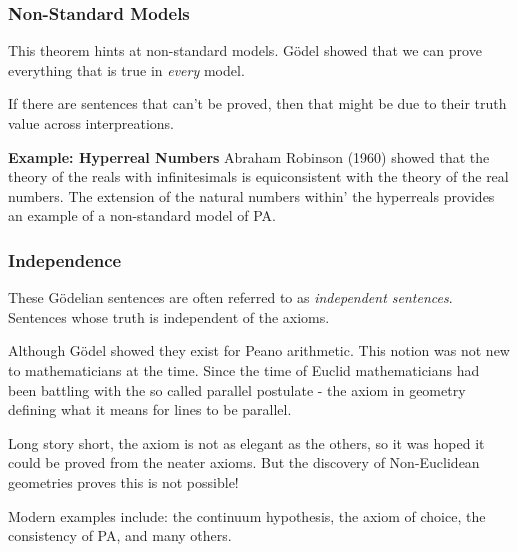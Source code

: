 \documentclass{beamer}
\begin{document}
\begin{frame}
	\frametitle{Non-Standard Models}
	
	This theorem hints at non-standard models. G\"{o}del showed that we can prove everything that is true in \textit{every} model. 
	
	\vspace{0.2cm}
	
	If there are sentences that can't be proved, then that might be due to their truth value across interpreations.
	
	\vspace{0.5cm}
	
	{\bf Example: Hyperreal Numbers} Abraham Robinson (1960) showed that the theory of the reals with infinitesimals is equiconsistent with the theory of the real numbers. The extension of the natural numbers within' the hyperreals provides an example of a non-standard model of PA. 
	
	\vspace{4cm}
	
\end{frame}

\begin{frame}
	\frametitle{Independence}
	
	These G\"{o}delian sentences are often referred to as \emph{independent sentences}. Sentences whose truth is independent of the axioms. 
	
	\vspace{0.5cm}
	
	Although G\"{o}del showed they exist for Peano arithmetic. This notion was not new to mathematicians at the time. Since the time of Euclid mathematicians had been battling with the so called parallel postulate - the axiom in geometry defining what it means for lines to be parallel. 
	
	\vspace{0.5cm}
	
	Long story short, the axiom is not as elegant as the others, so it was hoped it could be proved from the neater axioms. But the discovery of Non-Euclidean geometries proves this is not possible! 
	
	\vspace{0.5cm}
	
	Modern examples include: the continuum hypothesis, the axiom of choice, the consistency of PA, and many others. 
	
\end{frame}
\end{document}
